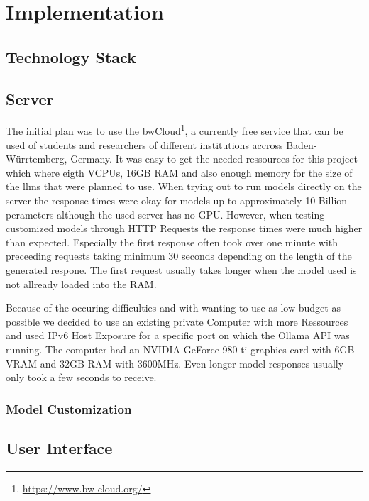 
\chapter{Implementation}
\label{chap:implementation}

\section{Technology Stack}


\section{Server}
The initial plan was to use the bwCloud\footnote{\url{https://www.bw-cloud.org/}}, a currently free service that can be used of students and researchers of different institutions accross Baden-Würrtemberg, Germany.
It was easy to get the needed ressources for this project which where eigth VCPUs, 16GB RAM and also enough memory for the size of the \glspl{llm} that were planned to use.
When trying out to run models directly on the server the response times were okay for models up to approximately 10 Billion perameters although the used server has no GPU.
However, when testing customized models through HTTP Requests the response times were much higher than expected.
Especially the first response often took over one minute with preceeding requests taking minimum 30 seconds depending on the length of the generated respone.
The first request usually takes longer when the model used is not allready loaded into the RAM.

Because of the occuring difficulties and with wanting to use as low budget as possible we decided to use an existing private Computer with more Ressources and used IPv6 Host Exposure for a specific port on which the Ollama API was running.
The computer had an NVIDIA GeForce 980 ti graphics card with 6GB VRAM and 32GB RAM with 3600MHz.
Even longer model responses usually only took a few seconds to receive.

\subsection{Model Customization}



\section{User Interface}
